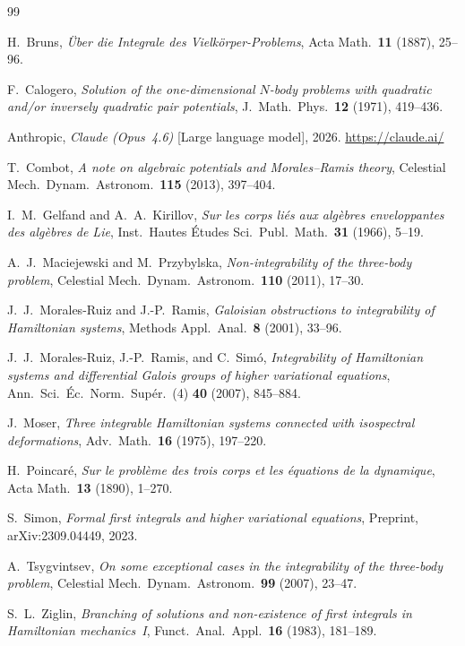 \documentclass[11pt,a4paper]{article}
\theoremstyle{remark}
\begin{document}
\begin{thebibliography}{99}

H.~Bruns,
\emph{\"{U}ber die Integrale des Vielk\"{o}rper-Problems},
Acta Math.\ \textbf{11} (1887), 25--96.

F.~Calogero,
\emph{Solution of the one-dimensional $N$-body problems with
quadratic and/or inversely quadratic pair potentials},
J.~Math.\ Phys.\ \textbf{12} (1971), 419--436.

Anthropic,
\emph{Claude (Opus~4.6)} [Large language model], 2026.
\url{https://claude.ai/}

T.~Combot,
\emph{A note on algebraic potentials and Morales--Ramis theory},
Celestial Mech.\ Dynam.\ Astronom.\ \textbf{115} (2013), 397--404.

I.~M.~Gelfand and A.~A.~Kirillov,
\emph{Sur les corps li\'{e}s aux alg\`{e}bres enveloppantes des
alg\`{e}bres de Lie},
Inst.\ Hautes \'{E}tudes Sci.\ Publ.\ Math.\ \textbf{31} (1966),
5--19.

A.~J.~Maciejewski and M.~Przybylska,
\emph{Non-integrability of the three-body problem},
Celestial Mech.\ Dynam.\ Astronom.\ \textbf{110} (2011), 17--30.

J.~J.~Morales-Ruiz and J.-P.~Ramis,
\emph{Galoisian obstructions to integrability of Hamiltonian
systems},
Methods Appl.\ Anal.\ \textbf{8} (2001), 33--96.

J.~J.~Morales-Ruiz, J.-P.~Ramis, and C.~Sim\'{o},
\emph{Integrability of Hamiltonian systems and differential
Galois groups of higher variational equations},
Ann.\ Sci.\ \'{E}c.\ Norm.\ Sup\'{e}r.\ (4) \textbf{40} (2007),
845--884.

J.~Moser,
\emph{Three integrable Hamiltonian systems connected with
isospectral deformations},
Adv.\ Math.\ \textbf{16} (1975), 197--220.

H.~Poincar\'{e},
\emph{Sur le probl\`{e}me des trois corps et les \'{e}quations
de la dynamique},
Acta Math.\ \textbf{13} (1890), 1--270.

S.~Simon,
\emph{Formal first integrals and higher variational equations},
Preprint, arXiv:2309.04449, 2023.

A.~Tsygvintsev,
\emph{On some exceptional cases in the integrability of the
three-body problem},
Celestial Mech.\ Dynam.\ Astronom.\ \textbf{99} (2007), 23--47.

S.~L.~Ziglin,
\emph{Branching of solutions and non-existence of first
integrals in Hamiltonian mechanics~I},
Funct.\ Anal.\ Appl.\ \textbf{16} (1983), 181--189.

\end{thebibliography}
\end{document}
